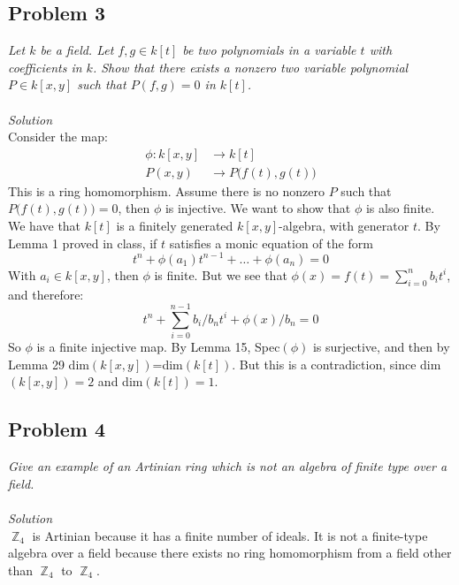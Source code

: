 \documentclass[12 pt]{article}
\DeclareMathOperator {\Z} {\mathbb{Z}}
\begin{document}
\subsection*{Problem 3}
\emph{Let $k$ be a field. Let $f, g \in k[t]$ be two polynomials in a variable $t$ with coefficients in $k$. Show that there exists a nonzero two variable polynomial $P \in k[x, y]$ such that $P(f, g) = 0$ in $k[t]$.}
\\
\\
\emph{Solution}
\\
Consider the map:
\begin{align*}
\phi : k[x,y] &\to k[t] \\
  P(x,y) &\to P\big(f(t), g(t)\big)
\end{align*}
This is a ring homomorphism. Assume there is no nonzero $P$ such that $P\big(f(t), g(t)\big) = 0$, then $\phi$ is injective. We want to show that $\phi$ is also finite. We have that $k[t]$ is a finitely generated $k[x,y]$-algebra, with generator $t$. By Lemma 1 proved in class, if $t$ satisfies a monic equation of the form
\[        t^n + \phi(a_1) t^{n-1} + \dots + \phi(a_n) = 0        \]
With $a_i \in k[x,y]$, then $\phi$ is finite. But we see that $\phi(x) = f(t) = \sum_{i=0}^n b_i t^i$, and therefore:
\[       t^n + \sum_{i=0}^{n-1} b_i/b_n t^i + \phi(x)/b_n = 0           \]
So $\phi$ is a finite injective map. By Lemma 15, Spec$(\phi)$ is surjective, and then by Lemma 29 dim$(k[x,y])$=dim$(k[t])$. But this is a contradiction, since dim$(k[x,y]) = 2$ and dim$(k[t]) = 1$.


\subsection*{Problem 4}
\emph{Give an example of an Artinian ring which is not an algebra of finite type over a field.}
\\
\\
\emph{Solution}
\\
$\Z_{4}$ is Artinian because it has a finite number of ideals. It is not a finite-type algebra over a field because there exists no ring homomorphism from a field other than $\Z_4$ to $\Z_4$.
\end{document}
